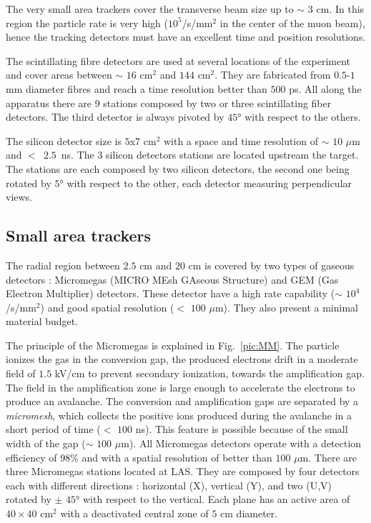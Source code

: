 The very small area trackers cover the transverse beam size up to $\sim$ $3$ cm. In this region the particle rate is very high ($10^5$/s/mm$^2$ in the center of the muon beam), hence the tracking detectors must have an excellent time and position resolutions.

The scintillating fibre detectors are used at several locations of the experiment and cover areas between $\sim$ $16$ cm$^2$ and $144$ cm$^2$. They are fabricated from $0.5$-$1$ mm diameter fibres and reach a time resolution better than $500$ ps. All along the apparatus there are $9$ stations composed by two or three scintillating fiber detectors. The third detector is always pivoted by $45$° with respect to the others.

The silicon detector size is $5$x$7$ cm$^2$ with a space and time resolution of $\sim$ $10$ $\mu$m and $<$~$2.5$~ns. The $3$ silicon detectors stations are located upstream the target. The stations are each composed by two silicon detectors, the second one being rotated by $5$° with respect to the other, each detector measuring perpendicular views.

\subsection{Small area trackers}

The radial region between $2.5$ cm and $20$ cm is covered by two types of gaseous detectors : Micromegas (MICRO MEsh GAseous Structure) and GEM (Gas Electron Multiplier) detectors. These detector have a high rate capability ($\sim$ $10^4$/s/mm$^2$) and good spatial resolution ($<$ $100$ $\mu$m). They also present a minimal material budget.

The principle of the Micromegas is explained in Fig.~\ref{pic:MM}. The particle ionizes the gas in the conversion gap, the produced electrons drift in a moderate field of $1.5$ kV/cm to prevent secondary ionization, towards the amplification gap. The field in the amplification zone is large enough to accelerate the electrons to produce an avalanche. The conversion and amplification gaps are separated by a \textit{micromesh}, which collects the positive ions produced during the avalanche in a short period of time ($<$ $100$ ns). This feature is possible because of the small width of the gap ($\sim$ $100$ $\mu$m). All Micromegas detectors operate with a detection efficiency of $98$\% and with a spatial resolution of better than $100$ $\mu$m. There are three Micromegas stations located at LAS. They are composed by four detectors each with different directions : horizontal (X), vertical (Y), and two (U,V) rotated by $\pm$ $45$° with respect to the vertical. Each plane has an active area of $40 \times 40$ cm$^2$ with a deactivated central zone of $5$ cm diameter.

